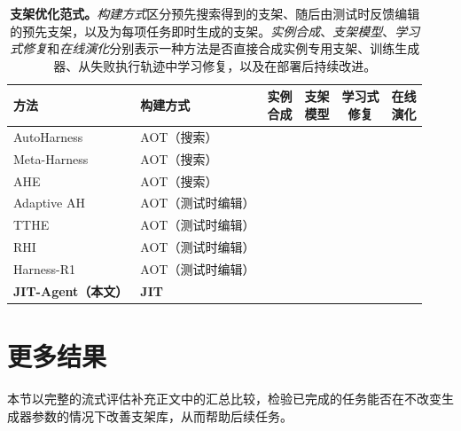 \documentclass{article}
\newcommand{\cmark}{\textcolor{goodgreen}{\ding{51}}}
\newcommand{\xmark}{\textcolor{badred}{\ding{55}}}
\newcommand{\ourmethod}{JIT-Agent\xspace}
\begin{document}
\begin{table}[!h]
\centering
\caption{\small \textbf{支架优化范式。}\emph{构建方式}区分预先搜索得到的支架、随后由测试时反馈编辑的预先支架，以及为每项任务即时生成的支架。\emph{实例合成}、\emph{支架模型}、\emph{学习式修复}和\emph{在线演化}分别表示一种方法是否直接合成实例专用支架、训练生成器、从失败执行轨迹中学习修复，以及在部署后持续改进。}
\label{tab:harness_optimization_comparison}
\footnotesize
\setlength{\tabcolsep}{3pt}
\renewcommand{\arraystretch}{0.9}
\begin{tabular}{@{}>{\RaggedRight\arraybackslash}p{} >{\centering\arraybackslash}p{} *{4}{c}@{}}
\toprule
方法 & 构建方式 & \shortstack{实例\\合成} & \shortstack{支架\\模型} & \shortstack{学习式\\修复} & \shortstack{在线\\演化} \\
\midrule
AutoHarness~\citep{lou2026autoharness} & AOT（搜索） & \xmark & \xmark & \xmark & \xmark \\
Meta-Harness~\citep{lee2026metaharnessendtoendoptimizationmodel} & AOT（搜索） & \xmark & \xmark & \xmark & \xmark \\
AHE~\citep{lin2026agenticharnessengineeringobservabilitydriven} & AOT（搜索） & \xmark & \xmark & \xmark & \xmark \\
Adaptive AH~\citep{liu2026adaptiveautoharness} & AOT（测试时编辑） & \xmark & \xmark & \xmark & \cmark \\
TTHE~\citep{nie2026tthe} & AOT（测试时编辑） & \xmark & \xmark & \xmark & \cmark \\
RHI~\citep{lee2026recursiveharness} & AOT（测试时编辑） & \xmark & \xmark & \xmark & \cmark \\
Harness-R1~\citep{shao2026harnessr1} & AOT（测试时编辑） & \xmark & \cmark & \cmark & \cmark \\
\midrule
\textbf{\ourmethod（本文）} & \textbf{JIT} & \cmark & \cmark & \cmark & \cmark \\
\bottomrule
\end{tabular}
\end{table}

\vspace{-0.5em}
\section{更多结果}
\vspace{-0.5em}
\label{sec:additional_results}
本节以完整的流式评估补充正文中的汇总比较，检验已完成的任务能否在不改变生成器参数的情况下改善支架库，从而帮助后续任务。
\end{document}
